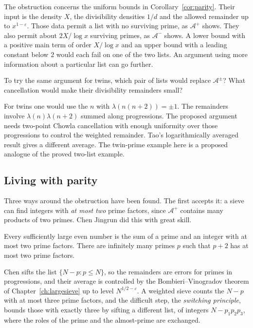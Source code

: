 The obstruction concerns the uniform bounds in Corollary~\ref{cor:parity}. Their input is the density $X$, the divisibility densities $1/d$ and the allowed remainder up to $x^{1-\varepsilon}$. Those data permit a list with no surviving prime, as $\mathcal A^+$ shows. They also permit about $2X/\log x$ surviving primes, as $\mathcal A^-$ shows. A lower bound with a positive main term of order $X/\log x$ and an upper bound with a leading constant below $2$ would each fail on one of the two lists. An argument using more information about a particular list can go further.

\begin{think}
To try the same argument for twins, which pair of lists would replace $\mathcal A^\pm$? What cancellation would make their divisibility remainders small?
\end{think}

For twins one would use the $n$ with $\lambda(n(n+2))=\pm1$. The remainders involve $\lambda(n)\lambda(n+2)$ summed along progressions. The proposed argument needs two-point Chowla cancellation with enough uniformity over those progressions to control the weighted remainder. Tao's logarithmically averaged result gives a different average. The twin-prime example here is a proposed analogue of the proved two-list example.

\subsection*{Living with parity}

Three ways around the obstruction have been found. The first accepts it: a sieve can find integers with \emph{at most two} prime factors, since $\mathcal A^+$ contains many products of two primes. Chen Jingrun did this with great skill.

\begin{theorem}\label{thm:chen}
Every sufficiently large even number is the sum of a prime and an integer with at most two prime factors. There are infinitely many primes $p$ such that $p+2$ has at most two prime factors.
\end{theorem}

Chen sifts the list $\{N-p:p\le N\}$, so the remainders are errors for primes in progressions, and their average is controlled by the Bombieri--Vinogradov theorem of Chapter~\ref{ch:largesieve} up to level $N^{1/2-\varepsilon}$. A weighted sieve counts the $N-p$ with at most three prime factors, and the difficult step, the \emph{switching principle}, bounds those with exactly three by sifting a different list, of integers $N-p_1p_2p_3$, where the roles of the prime and the almost-prime are exchanged.

